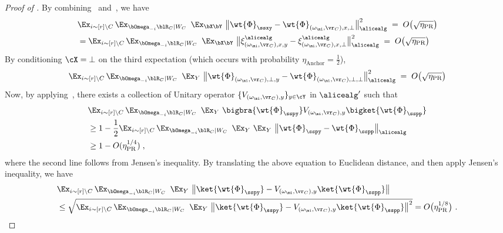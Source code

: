 \begin{proof}[Proof of ]
	By combining~ and~, we have
	\begin{align*}
		&\Ex_{i \sim [r] \setminus C} \, \Ex_{\bOmega_{-i} \blR_C |  W_C} \, \, \, \Ex_{\bX \bY} \,\, \big \| 	\wt{\Phi}_{\ssxy}- 	\wt{\Phi}_{(\omega_\mi, \vr_C), x,\bot} \big \|_\alicealg^2\; = \; O\big(\sqrt{\eta_{\text{PR}}} \big) \\
		&= \Ex_{i \sim [r] \setminus C} \, \Ex_{\bOmega_{-i} \blR_C |  W_C} \, \, \, \Ex_{\bX \bY} \,\, \big \| \xi^{\alicealg}_{(\omega_\mi, \vr_C), x,y} - \xi^{\alicealg}_{(\omega_\mi, \vr_C), x,\bot} \big \|_\alicealg^2\; = \; O\big(\sqrt{\eta_{\text{PR}}} \big)
	\end{align*}
	By conditioning $\cX = \bot$ on the third expectation (which occurs with probability $\eta_{\text{Anchor}} = \frac{1}{2}$),
	\begin{equation*}
		\Ex_{i \sim [r] \setminus C} \, \Ex_{\bOmega_{-i} \blR_C |  W_C} \, \, \, \Ex_{Y} \,\, \big \| 	\wt{\Phi}_{(\omega_\mi, \vr_C), \bot,y}- 	\wt{\Phi}_{(\omega_\mi, \vr_C), \bot, \bot} \big \|_\alicealg^2\; = \; O\big(\sqrt{\eta_{\text{PR}}} \big) 
	\end{equation*}
	Now, by applying~, there exists a collection of Unitary operator $\{V_{(\omega_{\mi}, \vr_C), y}\}_{y \in \cY}$ in $\alicealg'$ such that 
	\begin{align*}
		&\Ex_{i \sim [r] \setminus C} \, \Ex_{\bOmega_{-i} \blR_C |  W_C} \, \, \, \Ex_{Y} \,\,  \bigbra{\wt{\Phi}_\sspy } V_{(\omega_{\mi}, \vr_C), y}  \bigket{\wt{\Phi}_\sspp}  \notag \\
		&\geq 1 - \frac{1}{2} \Ex_{i \sim [r] \setminus C} \, \Ex_{\bOmega_{-i} \blR_C |  W_C} \, \, \, \Ex_{Y} \, \, \Ex_{Y}  \,\,  \big \| \wt{\Phi}_\sspy - \wt{\Phi}_\sspp \big \|_\alicealg \notag \\
		&\geq 1 - O(\eta_{\text{PR}}^{1/4})\;, 
	\end{align*}
	where the second line follows from Jensen's inequality. By translating the above equation to Euclidean distance, and then apply Jensen's inequality, we have
	\begin{align*}
		&\Ex_{i \sim [r] \setminus C} \, \Ex_{\bOmega_{-i} \blR_C |  W_C} \, \, \, \Ex_{Y} \,\,  \big \| \ket{\wt{\Phi}_\sspy } - V_{(\omega_{\mi}, \vr_C), y}  \ket{\wt{\Phi}_\sspp}  	\big \| \\
		& \leq \sqrt{\Ex_{i \sim [r] \setminus C} \, \Ex_{\bOmega_{-i} \blR_C |  W_C} \, \, \, \Ex_{Y} \,\,  \big \| \ket{\wt{\Phi}_\sspy } - V_{(\omega_{\mi}, \vr_C), y}  \ket{\wt{\Phi}_\sspp}  \big \|^2}= O\big(\eta_{\text{PR}}^{1/8}\big)~.

\end{align*}
\end{proof}
